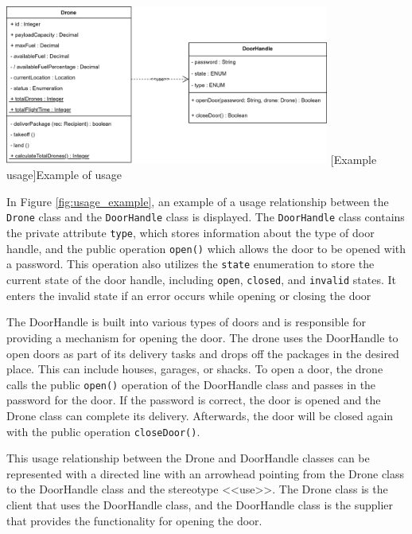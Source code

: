 \documentclass[
	12pt,
    a4paper,
    egregdoesnotlikesansseriftitles, %
    toc=chapterentrywithdots,
    oneside, openany,
    titlepage,
    parskip=half,
    headings=normal,  %
    listof=totoc,
    bibliography=totocnumbered,
    index=totoc,
    captions=tableheading,  %
    listof=flat,
    numbers=noenddot, %
    final]
    {scrbook}
\begin{document}
\vspace{1em}
\begin{minipage}{\linewidth}
	\centering
	\includegraphics[width=0.8\textwidth]{figures/dependencies/usage.jpg}
	[Example usage]{Example of usage}
	\label{fig:usage_example}
\end{minipage}
\vspace{1em}


In Figure \ref{fig:usage_example}, an example of a usage relationship between the \texttt{Drone} class and the \texttt{DoorHandle} class is displayed. The \texttt{DoorHandle} class contains the private attribute \texttt{type}, which stores information about the type of door handle, and the public operation \texttt{open()} which allows the door to be opened with a password.
This operation also utilizes the \texttt{state} enumeration to store the current state of the door handle, including \texttt{open}, \texttt{closed}, and \texttt{invalid} states.
It enters the invalid state if an error occurs while opening or closing the door

The DoorHandle is built into various types of doors and is responsible for providing a mechanism for opening the door. 
The drone uses the DoorHandle to open doors as part of its delivery tasks and drops off the packages in the desired place. 
This can include houses, garages, or shacks. 
To open a door, the drone calls the public \texttt{open()} operation of the DoorHandle class and passes in the password for the door. 
If the password is correct, the door is opened and the Drone class can complete its delivery. 
Afterwards, the door will be closed again with the public operation \texttt{closeDoor()}.

This usage relationship between the Drone and DoorHandle classes can be represented with a directed line with an arrowhead pointing from the Drone class to the DoorHandle class and the stereotype <<use>>. The Drone class is the client that uses the DoorHandle class, and the DoorHandle class is the supplier that provides the functionality for opening the door.
\end{document}
